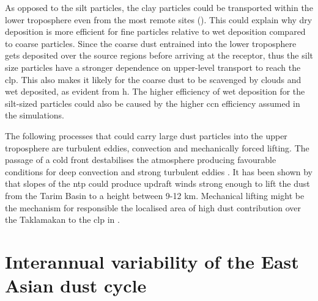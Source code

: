As opposed to the silt particles, the clay particles could be transported within the lower troposphere even from the most remote sites (). 
This could explain why dry deposition is more efficient for fine particles relative to wet deposition compared to coarse particles. 
Since the coarse dust entrained into the lower troposphere gets deposited over the source regions before arriving at the receptor, thus the silt size particles have a stronger dependence on upper-level transport to reach the \acrshort{clp}. 
This also makes it likely for the coarse dust to be scavenged by clouds and wet deposited, as evident from h. The higher efficiency of wet deposition for the silt-sized particles could also be caused by the higher \acrshort{ccn} efficiency assumed in the simulations. 

The following processes that could carry large dust particles into the upper troposphere are turbulent eddies, convection and mechanically forced lifting. 
The passage of a cold front destabilises the atmosphere producing favourable conditions for deep convection and strong turbulent eddies \parencite{markowski2011mesoscale}.    
It has been shown by \textcite{yumimoto_elevated_2009} that slopes of the \acrfull{ntp} could produce updraft winds strong enough to lift the dust from the Tarim Basin to a height between 9-12 km. Mechanical lifting might be the mechanism for responsible the localised area of high dust contribution over the Taklamakan to the \acrshort{clp} in .    

\section{Interannual variability of the East Asian dust cycle}\label{sec:interannual_variabiity }
